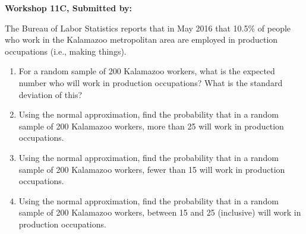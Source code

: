 \documentclass[11pt, chapterprefix=true]{scrbook}\usepackage[]{graphicx}\usepackage[]{color}
\begin{document}
\begin{exercises}
\begin{solution}
\end{solution}

\clearpage

    \begin{exercise}  %

    \begin{center}
\begin{flushleft}\textbf{\large \hfill Workshop 11C, Submitted by: }\end{flushleft}

\end{center}

The Bureau of Labor Statistics reports that in May 2016 that 10.5\% of people who work in the Kalamazoo metropolitan area are employed in production occupations (i.e., making things).

\begin{enumerate}
\item For a random sample of 200 Kalamazoo workers, what is the expected number who will work in production occupations? What is the standard deviation of this?
\item Using the normal approximation, find the probability that in a random sample of 200 Kalamazoo workers, more than 25 will work in production occupations.
\item Using the normal approximation, find the probability that in a random sample of 200 Kalamazoo workers, fewer than 15 will work in production occupations.
\item Using the normal approximation, find the probability that in a random sample of 200 Kalamazoo workers, between 15 and 25 (inclusive) will work in production occupations.
\end{enumerate}

\end{exercise}
\begin{solution}


\end{solution}



\end{exercises}
\end{document}
